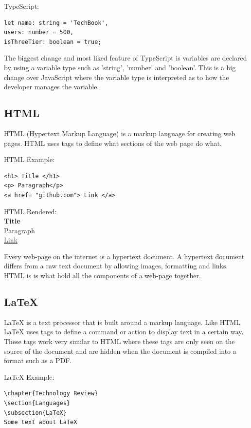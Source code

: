 TypeScript:
\begin{verbatim}
let name: string = 'TechBook',
users: number = 500,
isThreeTier: boolean = true;
\end{verbatim}

The biggest change and most liked feature of TypeScript is variables are declared by using a variable type such as 'string', 'number' and 'boolean'. This is a big change over JavaScript where the variable type is interpreted as to how the developer manages the variable.

\subsection{HTML}
HTML (Hypertext Markup Language) is a markup language for creating web pages. HTML uses tags to define what sections of the web page do what. 

HTML Example:
\begin{verbatim}
<h1> Title </h1>
<p> Paragraph</p>
<a href= "github.com"> Link </a>
\end{verbatim}

HTML Rendered: \\
\textbf{Title} \\
Paragraph \\
\href{http://www.sharelatex.com}{Link}

\vspace{5mm}

Every web-page on the internet is a hypertext document. A hypertext document differs from a raw text document by allowing images, formatting and links. HTML is is what hold all the components of a web-page together. 

\subsection{LaTeX}
LaTeX is a text processor that is built around a markup language. Like HTML LaTeX uses tags to define a command or action to display text in a certain way. These tags work very similar to HTML where these tags are only seen on the source of the document and are hidden when the document is compiled into a format such as a PDF.

LaTeX Example:
\begin{verbatim}
\chapter{Technology Review}
\section{Languages}
\subsection{LaTeX}
Some text about LaTeX
\end{verbatim}

